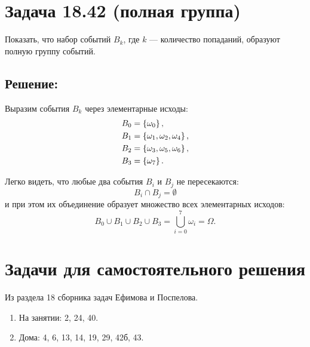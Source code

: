 \section*{Задача 18.42 (полная группа)}

Показать, что набор событий $B_k$, где $k$ --- количество попаданий, образуют полную группу событий.

\subsection*{Решение:}

Выразим события $B_k$ через элементарные исходы:
\begin{align}
    B_0 & = \left \{  \omega_0  \right \}, \\
    B_1 & = \left \{  \omega_1, \omega_2, \omega_4  \right \}, \\
    B_2 & = \left \{  \omega_3, \omega_5, \omega_6  \right \}, \\
    B_3 & = \left \{  \omega_7  \right \}.
\end{align}

Легко видеть, что любые два события $B_i$ и $B_j$ не пересекаются:
\[
    B_i \cap B_j = \emptyset
\]
и при этом их объединение образует множество всех элементарных исходов:
\[
    B_0 \cup B_1 \cup B_2 \cup B_3 = \bigcup_{i=0}^7 \omega_i = \Omega .
\]

\section*{Задачи для самостоятельного решения}

Из раздела 18 сборника задач Ефимова и Поспелова.
\begin{enumerate}
    \item На занятии: 2, 24, 40.
    \item Дома: 4, 6, 13, 14, 19, 29, 42б, 43.
\end{enumerate}